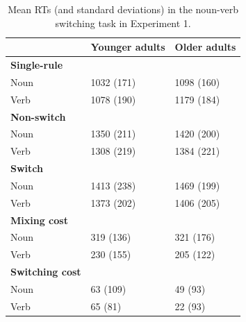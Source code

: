 \documentclass[
]{article}
\begin{document}
\begin{table}

\caption{\label{tab:Table1}Mean RTs (and standard deviations) in the noun-verb switching task in Experiment 1.}
\centering
\begin{tabular}[t]{lll}
\toprule
\textbf{} & \textbf{Younger adults} & \textbf{Older adults}\\
\midrule
\textbf{Single-rule} & \textbf{} & \textbf{}\\
Noun & 1032 (171) & 1098 (160)\\
Verb & 1078 (190) & 1179 (184)\\
\textbf{Non-switch} & \textbf{} & \textbf{}\\
Noun & 1350 (211) & 1420 (200)\\
\addlinespace
Verb & 1308 (219) & 1384 (221)\\
\textbf{Switch} & \textbf{} & \textbf{}\\
Noun & 1413 (238) & 1469 (199)\\
Verb & 1373 (202) & 1406 (205)\\
\textbf{Mixing cost} & \textbf{} & \textbf{}\\
\addlinespace
Noun & 319 (136) & 321 (176)\\
Verb & 230 (155) & 205 (122)\\
\textbf{Switching cost} & \textbf{} & \textbf{}\\
Noun & 63 (109) & 49 (93)\\
Verb & 65 (81) & 22 (93)\\
\bottomrule
\end{tabular}
\end{table}
\end{document}
